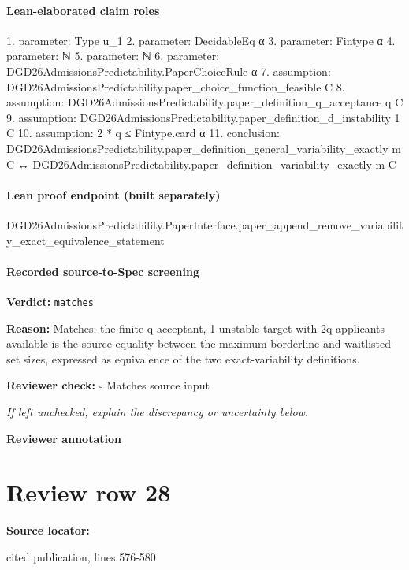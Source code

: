 \documentclass[10pt]{article}
\newcommand{\reviewerbox}{%
  \par\noindent\fbox{\parbox{0.96\linewidth}{\rule{0pt}{0.38in}}}\par
}
\newcommand{\reviewmatch}[1]{%
  \par\noindent\textbf{Reviewer check:} $\square$\; #1\par
  \noindent\emph{If left unchecked, explain the discrepancy or uncertainty below.}\par
}
\begin{document}
\paragraph{Lean-elaborated claim roles}\begin{ReviewVerbatim}
1. parameter: Type u_1
2. parameter: DecidableEq α
3. parameter: Fintype α
4. parameter: ℕ
5. parameter: ℕ
6. parameter: DGD26AdmissionsPredictability.PaperChoiceRule α
7. assumption: DGD26AdmissionsPredictability.paper_choice_function_feasible C
8. assumption: DGD26AdmissionsPredictability.paper_definition_q_acceptance q C
9. assumption: DGD26AdmissionsPredictability.paper_definition_d_instability 1 C
10. assumption: 2 * q ≤ Fintype.card α
11. conclusion: DGD26AdmissionsPredictability.paper_definition_general_variability_exactly m C ↔
  DGD26AdmissionsPredictability.paper_definition_variability_exactly m C
\end{ReviewVerbatim}

\paragraph{Lean proof endpoint (built separately)}\begin{ReviewVerbatim}
DGD26AdmissionsPredictability.PaperInterface.paper_append_remove_variability_exact_equivalence_statement
\end{ReviewVerbatim}

\paragraph{Recorded source-to-Spec screening}
\textbf{Verdict:} \texttt{matches}
\\
{\raggedright
\textbf{Reason:} Matches:\allowbreak{} the finite q-\allowbreak{}acceptant, 1-\allowbreak{}unstable target with 2q applicants available is the source equality between the maximum borderline and waitlisted-\allowbreak{}set sizes, expressed as equivalence of the two exact-\allowbreak{}variability definitions.\allowbreak{}
\par}
\reviewmatch{Matches source input}
\noindent\textbf{Reviewer annotation}\par
\reviewerbox
\clearpage
\hypertarget{source-claim-e1e0f5f892109672}{}
\section*{Review row 28}
\textbf{Source locator:} {\footnotesize\raggedright cited publication, lines 576-\allowbreak{}580\par}
\end{document}

